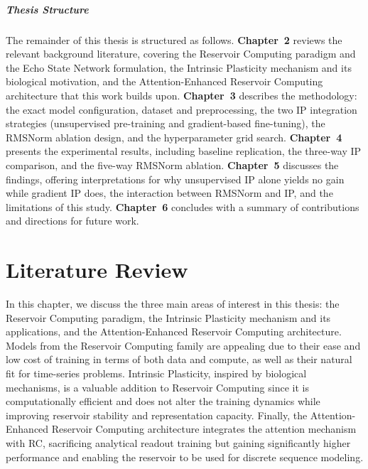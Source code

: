 \documentclass{sapthesis}
\begin{document}
\paragraph{Thesis Structure}
The remainder of this thesis is structured as follows.
\textbf{Chapter~2} reviews the relevant background literature, covering the Reservoir Computing paradigm and the Echo State Network formulation, the Intrinsic Plasticity mechanism and its biological motivation, and the Attention-Enhanced Reservoir Computing architecture that this work builds upon.
\textbf{Chapter~3} describes the methodology: the exact model configuration, dataset and preprocessing, the two IP integration strategies (unsupervised pre-training and gradient-based fine-tuning), the RMSNorm ablation design, and the hyperparameter grid search.
\textbf{Chapter~4} presents the experimental results, including baseline replication, the three-way IP comparison, and the five-way RMSNorm ablation.
\textbf{Chapter~5} discusses the findings, offering interpretations for why unsupervised IP alone yields no gain while gradient IP does, the interaction between RMSNorm and IP, and the limitations of this study.
\textbf{Chapter~6} concludes with a summary of contributions and directions for future work.


\chapter{Literature Review}
In this chapter, we discuss the three main areas of interest in this thesis: the Reservoir Computing paradigm, the Intrinsic Plasticity mechanism and its applications, and the Attention-Enhanced Reservoir Computing architecture.
Models from the Reservoir Computing family are appealing due to their ease and low cost of training in terms of both data and compute, as well as their natural fit for time-series problems. Intrinsic Plasticity, inspired by biological mechanisms, is a valuable addition to Reservoir Computing since it is computationally efficient and does not alter the training dynamics while improving reservoir stability and representation capacity. Finally, the Attention-Enhanced Reservoir Computing architecture integrates the attention mechanism with RC, sacrificing analytical readout training but gaining significantly higher performance and enabling the reservoir to be used for discrete sequence modeling.
\end{document}
